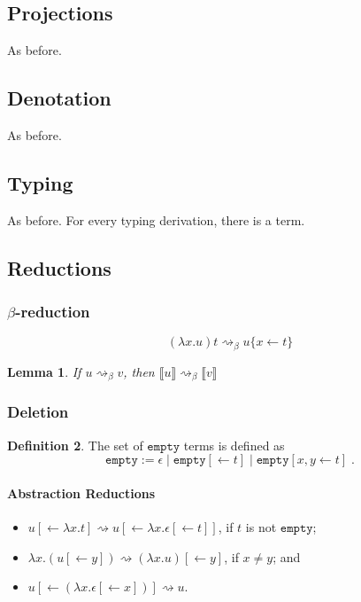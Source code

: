 \documentclass[11pt,a4paper]{article}
\theoremstyle{definition}
\newtheorem{definition}{Definition}
\theoremstyle{plain}
\newtheorem{lemma}[definition]{Lemma}
\theoremstyle{remark}
\begin{document}
\subsection{Projections}

As before.

\subsection{Denotation}

As before.

\subsection{Typing}

As before. For every typing derivation, there is a term.

\subsection{Reductions}

\subsubsection{$\beta$-reduction}

\[
(\lambda x.u)t \rightsquigarrow_\beta u\{x\leftarrow t\}
\]


\begin{lemma}
If $u\rightsquigarrow_\beta v$, then $\llbracket u\rrbracket \rightsquigarrow_\beta\llbracket v\rrbracket$
\end{lemma}

\subsubsection{Deletion}

\newcommand{\tempty}{{\mathtt{empty}}}

\begin{definition}
The set of $\tempty$ terms is defined as
\[\tempty:=\epsilon\;|\;\tempty[\leftarrow t]\;|\;\tempty[x,y\leftarrow t]\;.\]
\end{definition}

\paragraph{Abstraction Reductions}

\begin{itemize}
\item $u[\leftarrow\lambda x.t]\rightsquigarrow u[\leftarrow\lambda x.\epsilon[\leftarrow t]]$, if $t$ is not $\tempty$;
\item $\lambda x.(u[\leftarrow y])\rightsquigarrow (\lambda x.u)[\leftarrow y]$, if $x\neq y$; and
\item $u[\leftarrow(\lambda x.\epsilon[\leftarrow x])]\rightsquigarrow u$.
\end{itemize}
\end{document}
